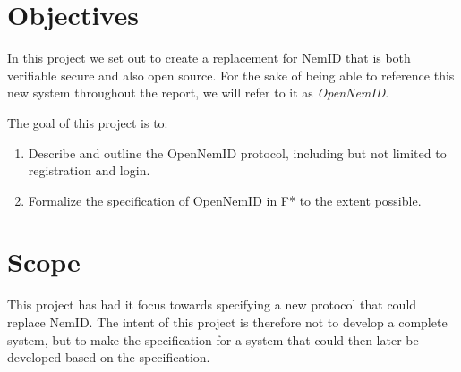 \documentclass[twosided]{report}
\begin{document}
\section{Objectives}
In this project we set out to create a replacement for NemID that is both verifiable secure and also open source. For the sake of being able to reference this new system throughout the report, we will refer to it as \emph{OpenNemID}.
\par
The goal of this project is to:
\begin{enumerate}
	\item Describe and outline the OpenNemID protocol, including but not limited to registration and login.
	\item Formalize the specification of OpenNemID in F* to the extent possible.
\end{enumerate}

\section{Scope}
This project has had it focus towards specifying a new protocol that could replace NemID. The intent of this project is therefore not to develop a complete system, but to make the specification for a system that could then later be developed based on the specification.
\end{document}
